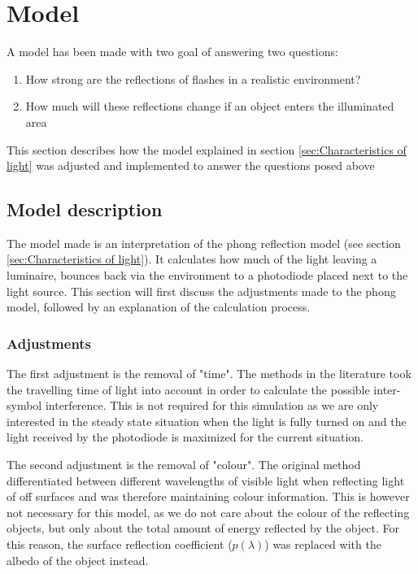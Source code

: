 \chapter{Model}
\label{Model}

A model has been made with two goal of answering two questions:
\begin{enumerate}\itemsep2pt
	\item How strong are the reflections of flashes in a realistic environment?
	\item How much will these reflections change if an object enters the illuminated area
\end{enumerate}
This section describes how the model explained in section \ref{sec:Characteristics of light} was adjusted and implemented to answer the questions posed above

\section{Model description}
The model made is an interpretation of the phong reflection model (see section \ref{sec:Characteristics of light}). It calculates how much of the light leaving a luminaire, bounces back via the environment to a photodiode placed next to the light source. This section will first discuss the adjustments made to the phong model, followed by an explanation of the calculation process.

\subsection{Adjustments}
The first adjustment is the removal of "time". The methods in the literature took the travelling time of light into account in order to calculate the possible inter-symbol interference. This is not required for this simulation as we are only interested in the steady state situation when the light is fully turned on and the light received by the photodiode is maximized for the current situation.

The second adjustment is the removal of "colour". The original method differentiated between different wavelengths of visible light when reflecting light of off surfaces and was therefore maintaining colour information. This is however not necessary for this model, as we do not care about the colour of the reflecting objects, but only about the total amount of energy reflected by the object. For this reason, the surface reflection coefficient ($p(\lambda)$) was replaced with the albedo of the object instead.

